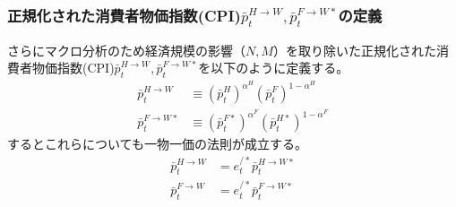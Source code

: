 \subsubsection{正規化された消費者物価指数(CPI)\(\bar{p}_t^{H\to W}, \bar{p}_t^{F\to W*}\)の定義}
\label{sec:chapter3_households_stage1b_normalized_cpi_definitions}
さらにマクロ分析のため経済規模の影響（\(N,M\)）を取り除いた正規化された消費者物価指数(CPI)\(\bar{p}_t^{H\to W}, \bar{p}_t^{F\to W*}\)を以下のように定義する。
\begin{align}
    \label{form:chapter3_households_stage1b_normalized_cpi_definitions_p_H_W_bar_def}
        \bar{p}_t^{H\to W}&\equiv(\bar{p}_t^H)^{\alpha^H}(\bar{p}_t^F)^{1-\alpha^H} \\
    \label{form:chapter3_households_stage1b_normalized_cpi_definitions_p_F_W_star_bar_def}
        \bar{p}_t^{F\to W*}&\equiv(\bar{p}_t^{F*})^{\alpha^F}(\bar{p}_t^{H*})^{1-\alpha^F}
\end{align}
するとこれらについても一物一価の法則が成立する。
\begin{align}
    \label{form:chapter3_households_stage1b_normalized_cpi_definitions_p_H_W_bar_lop}
        \bar{p}_t^{H\to W}&=e_t^{/*}\bar{p}_t^{H\to W*} \\
    \label{form:chapter3_households_stage1b_normalized_cpi_definitions_p_F_W_bar_lop}
        \bar{p}_t^{F\to W}&=e_t^{/*}\bar{p}_t^{F\to W*}
\end{align}

